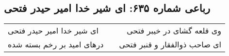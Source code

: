 \begin{center}
\section*{رباعی شماره ۶۳۵: ای شیر خدا امیر حیدر فتحی}
\label{sec:sh635}
\begin{longtable}{l p{0.5cm} r}
ای شیر خدا امیر حیدر فتحی
&&
وی قلعه گشای در خیبر فتحی
\\
درهای امید بر رخم بسته شده
&&
ای صاحب ذوالفقار و قنبر فتحی
\\
\end{longtable}
\end{center}

